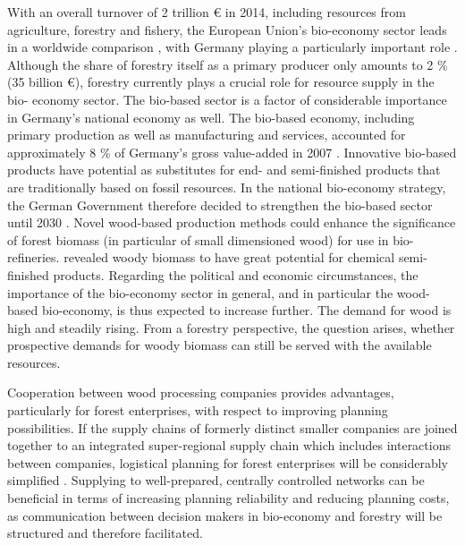 With an overall turnover of 2 trillion {\euro} in 2014, including resources from agriculture, forestry and fishery, the European Union's bio-economy sector leads in a worldwide comparison \citep[p. 221, 223]{elchichakli_2016}, with Germany playing a particularly important role \citep[p. 200]{hennig_2016}. Although the share of forestry itself as a primary producer only amounts to 2 \% (35 billion {\euro}), forestry currently plays a crucial role for resource supply in the bio- economy sector. The bio-based sector is a factor of considerable importance in Germany's national economy as well. The bio-based economy, including primary production as well as manufacturing and services, accounted for approximately 8 \% of Germany's gross value-added in 2007 \citep[p. 29-30]{efken_2012}. Innovative bio-based products have potential as substitutes for end- and semi-finished products that are traditionally based on fossil resources. In the national bio-economy strategy, the German Government therefore decided to strengthen the bio-based sector until 2030 \citep[p. 15-16]{bmel_2014b}. Novel wood-based production methods could enhance the significance of forest biomass (in particular of small dimensioned wood) for use in bio-refineries. \citet[p. 49]{ekman_2013} revealed woody biomass to have great potential for chemical semi-finished products. Regarding the political and economic circumstances, the importance of the bio-economy sector in general, and in particular the wood-based bio-economy, is thus expected to increase further. The demand for wood is high and steadily rising. From a forestry perspective, the question arises, whether prospective demands for woody biomass can still be served with the available resources.

Cooperation between wood processing companies provides advantages, particularly for forest enterprises, with respect to improving planning possibilities. If the supply chains of formerly distinct smaller companies are joined together to an integrated super-regional supply chain which includes interactions between companies, logistical planning for forest enterprises will be considerably simplified \citep[p. 3]{geldermann_2016}. Supplying to well-prepared, centrally controlled networks can be beneficial in terms of increasing planning reliability and reducing planning costs, as communication between decision makers in bio-economy and forestry will be structured and therefore facilitated.

